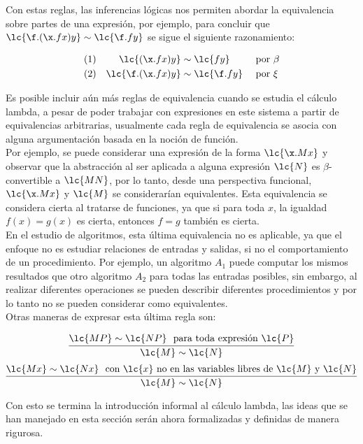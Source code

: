 Con estas reglas, las inferencias lógicas nos permiten abordar la equivalencia
sobre partes de una expresión, por ejemplo, para concluir que \(\lc{\f.(\x.f
  x)y} \sim \lc{\f.f y}\) se sigue el siguiente razonamiento:

\begin{align*}
  (1)& &\lc{(\x.f x)y} &\sim \lc{f y} & &\text{ por \(\beta\)} \\
  (2)& &\lc{\f.(\x.f x)y} &\sim \lc{\f.f y} & &\text{ por \(\xi\)}
\end{align*}

Es posible incluir aún más reglas de equivalencia cuando se estudia el cálculo
lambda, a pesar de poder trabajar con expresiones en este sistema a partir de
equivalencias arbitrarias, usualmente cada regla de equivalencia se asocia
con alguna argumentación basada en la noción de función. \\

Por ejemplo, se puede considerar una expresión de la forma \(\lc{\x.M x}\) y
observar que la abstracción al ser aplicada a alguna expresión \(\lc{N}\) es
\(\beta\)-convertible a \(\lc{M N}\), por lo tanto, desde una perspectiva
funcional, \(\lc{\x.M x}\) y \(\lc{M}\) se considerarían equivalentes. Esta
equivalencia se considera cierta al tratarse de funciones, ya que si para toda \(x\),
la igualdad \(f(x) = g(x)\) es cierta, entonces \(f = g\) también es cierta. \\

En el estudio de algoritmos, esta última equivalencia no es aplicable, ya que el
enfoque no es estudiar relaciones de entradas y salidas, si no el comportamiento
de un procedimiento. Por ejemplo, un algoritmo \(A_{1}\) puede computar los
mismos resultados que otro algoritmo \(A_{2}\) para todas las entradas posibles,
sin embargo, al realizar diferentes operaciones se pueden describir diferentes
procedimientos y por lo tanto no se pueden considerar como equivalentes. \\

Otras maneras de expresar esta última regla son:

\[\infer{\lc{M} \sim \lc{N}}{\lc{M P} \sim \lc{N P}\ \text{ para toda expresión
      \(\lc{P}\)}}\]
\[\infer{\lc{M} \sim \lc{N}}{\lc{M x} \sim \lc{N x}\ \text{ con \(\lc{x}\) no en las variables
      libres de \(\lc{M}\) y \(\lc{N}\)}}\]

Con esto se termina la introducción informal al cálculo lambda, las ideas que se
han manejado en esta sección serán ahora formalizadas y definidas de manera
rigurosa. \\

